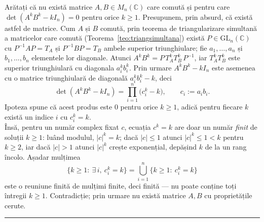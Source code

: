 Arătați că nu există matrice $A,B\in M_n(\mathbb{C})$ care comută și pentru care $\det(A^kB^k-kI_n)=0$ pentru orice $k\ge1$.
\sol Presupunem, prin absurd, că există astfel de matrice. Cum $A$ și $B$ comută, prin teorema de triangularizare simultană a matricelor care comută (Teorema~\ref{teo:triangsimultana}) există $P\in\mathrm{GL}_n(\mathbb{C})$ cu $P^{-1}AP=T_A$ și $P^{-1}BP=T_B$ ambele superior triunghiulare; fie $a_1,\dots,a_n$ și $b_1,\dots,b_n$ elementele lor diagonale. Atunci $A^kB^k=P\,T_A^kT_B^k\,P^{-1}$, iar $T_A^kT_B^k$ este superior triunghiulară cu diagonala $a_i^kb_i^k$. Prin urmare $A^kB^k-kI_n$ este asemenea cu o matrice triunghiulară de diagonală $a_i^kb_i^k-k$, deci
\[ \det(A^kB^k-kI_n)=\prod_{i=1}^n\bigl(c_i^k-k\bigr),\qquad c_i:=a_ib_i. \]
Ipoteza spune că acest produs este $0$ pentru orice $k\ge1$, adică pentru fiecare $k$ există un indice $i$ cu $c_i^k=k$.\\[2pt]
Însă, pentru un număr complex fixat $c$, ecuația $c^k=k$ are doar un număr \emph{finit} de soluții $k\ge1$: luând modulul, $|c|^k=k$; dacă $|c|\le1$ atunci $|c|^k\le1<k$ pentru $k\ge2$, iar dacă $|c|>1$ atunci $|c|^k$ crește exponențial, depășind $k$ de la un rang încolo. Așadar mulțimea
\[ \{k\ge1:\ \exists\,i,\ c_i^k=k\}=\bigcup_{i=1}^n\{k\ge1:\ c_i^k=k\} \]
este o reuniune finită de mulțimi finite, deci finită --- nu poate conține toți întregii $k\ge1$. Contradicție; prin urmare nu există matrice $A,B$ cu proprietățile cerute.
\vspace{1mm}\hrule

